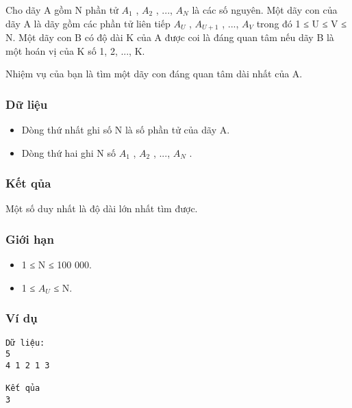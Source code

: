 



   Cho dãy A gồm N phần tử $A_{1}$   , $A_{2}$   , ..., $A_{N}$   là các số nguyên. Một dãy con của dãy A là dãy gồm các phần tử liên tiếp $A_{U}$   , $A_{U+1}$   , ...,   $A_{V}$   trong đó 1 ≤ U ≤ V ≤ N. Một dãy con B có độ dài K của A được coi là đáng quan tâm nếu dãy B là một hoán vị của K số 1, 2, ..., K.  

   Nhiệm vụ của bạn là tìm một dãy con đáng quan tâm dài nhất của A.  

\subsubsection{   Dữ liệu  }
\begin{itemize}
	\item     Dòng thứ nhất ghi số N là số phần tử của dãy A.   
	\item     Dòng thứ hai ghi N số $A_{1}$    , $A_{2}$    , ...,  $A_{N}$    .   
\end{itemize}

\subsubsection{   Kết qủa  }

   Một số duy nhất là độ dài lớn nhất tìm được.  

\subsubsection{   Giới hạn  }
\begin{itemize}
	\item     1 ≤ N ≤ 100 000.   
	\item     1 ≤ $A_{U}$    ≤ N.   
\end{itemize}

\subsubsection{   Ví dụ  }
\begin{verbatim}
Dữ liệu:
5
4 1 2 1 3

Kết qủa
3
\end{verbatim}

